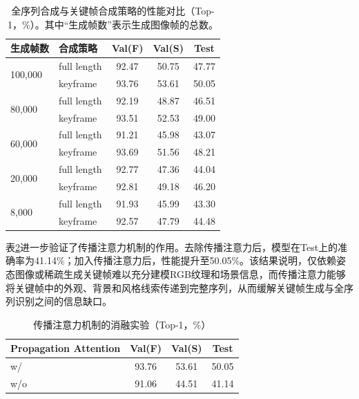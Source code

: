 \begin{table}[H]
    \centering
    \caption{全序列合成与关键帧合成策略的性能对比（Top-1，\%）。其中“生成帧数”表示生成图像帧的总数。}
    \label{tab:condition_semantic_keyframe_strategy}
    \setlength{\tabcolsep}{3.5pt}
    \begin{tabular}{llccc}
        \toprule
        生成帧数 & 合成策略 & Val(F) & Val(S) & Test \\
        \midrule
        \multirow{2}{*}{100,000} & full length & 92.47 & 50.75 & 47.77 \\
                                 & keyframe & 93.76 & 53.61 & 50.05 \\
        \midrule
        \multirow{2}{*}{80,000} & full length & 92.19 & 48.87 & 46.51 \\
                                & keyframe & 93.51 & 52.53 & 49.00 \\
        \midrule
        \multirow{2}{*}{60,000} & full length & 91.21 & 45.98 & 43.07 \\
                                & keyframe & 93.69 & 51.56 & 48.21 \\
        \midrule
        \multirow{2}{*}{20,000} & full length & 92.77 & 47.36 & 44.04 \\
                                & keyframe & 92.81 & 49.18 & 46.20 \\
        \midrule
        \multirow{2}{*}{8,000} & full length & 91.93 & 45.99 & 43.30 \\
                               & keyframe & 92.57 & 47.79 & 44.48 \\
        \bottomrule
    \end{tabular}
\end{table}

表\ref{tab:condition_semantic_propagation}进一步验证了传播注意力机制的作用。去除传播注意力后，模型在Test上的准确率为41.14\%；加入传播注意力后，性能提升至50.05\%。该结果说明，仅依赖姿态图像或稀疏生成关键帧难以充分建模RGB纹理和场景信息，而传播注意力能够将关键帧中的外观、背景和风格线索传递到完整序列，从而缓解关键帧生成与全序列识别之间的信息缺口。

\begin{table}[H]
    \centering
    \caption{传播注意力机制的消融实验（Top-1，\%）}
    \label{tab:condition_semantic_propagation}
    \setlength{\tabcolsep}{5pt}
    \begin{tabular}{@{}lccc@{}}
        \toprule
        Propagation Attention & Val(F) & Val(S) & Test \\
        \midrule
        w/ & 93.76 & 53.61 & 50.05 \\
        w/o & 91.06 & 44.51 & 41.14 \\
        \bottomrule
    \end{tabular}
\end{table}

